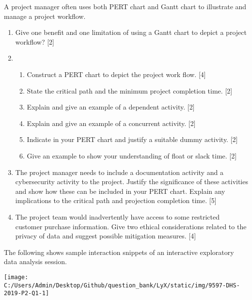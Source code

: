A project manager often uses both PERT chart and Gantt chart to illustrate
and manage a project workflow. 
\begin{enumerate}
\item Give one benefit and one limitation of using a Gantt chart to depict
a project workflow?\hfill{} {[}2{]}
\item {}
\begin{enumerate}
\item Construct a PERT chart to depict the project work flow.\hfill{} {[}4{]}
\item State the critical path and the minimum project completion time. \hfill{}{[}2{]}
\item Explain and give an example of a dependent activity.\hfill{} {[}2{]}
\item Explain and give an example of a concurrent activity. \hfill{}{[}2{]}
\item Indicate in your PERT chart and justify a suitable dummy activity.
\hfill{}{[}2{]}
\item Give an example to show your understanding of float or slack time.\hfill{}
{[}2{]}
\end{enumerate}
\item The project manager needs to include a documentation activity and
a cybersecurity activity to the project. Justify the significance
of these activities and show how these can be included in your PERT
chart. Explain any implications to the critical path and projection
completion time. \hfill{}{[}5{]}
\item The project team would inadvertently have access to some restricted
customer purchase information. Give two ethical considerations related
to the privacy of data and suggest possible mitigation measures.\hfill{}
{[}4{]}
\end{enumerate}
The following shows sample interaction snippets of an interactive
exploratory data analysis session. 
\begin{center}
\texttt{[image: C:/Users/Admin/Desktop/Github/question\_bank/LyX/static/img/9597-DHS-2019-P2-Q1-1]}
\par\end{center}

